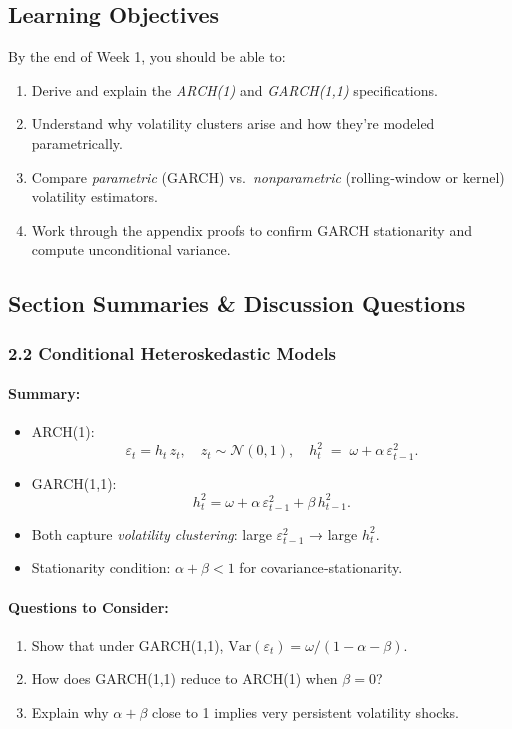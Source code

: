 \documentclass[11pt]{amsart}
\begin{document}
\subsection{Learning Objectives}
By the end of Week 1, you should be able to:
\begin{enumerate}[noitemsep,left=0pt]
  \item Derive and explain the \emph{ARCH(1)} and \emph{GARCH(1,1)} specifications.
  \item Understand why volatility clusters arise and how they're modeled parametrically.
  \item Compare \emph{parametric} (GARCH) vs.\ \emph{nonparametric} (rolling‐window or kernel) volatility estimators.
  \item Work through the appendix proofs to confirm GARCH stationarity and compute unconditional variance.
\end{enumerate}

\subsection{Section Summaries \& Discussion Questions}

\subsubsection{2.2 Conditional Heteroskedastic Models}
\paragraph{Summary:}
\begin{itemize}[noitemsep,left=0pt]
  \item ARCH(1):
    \[
      \varepsilon_t = h_t\,z_t,\quad z_t \sim \mathcal{N}(0,1),
      \quad
      h_t^2 \;=\; \omega + \alpha\,\varepsilon_{t-1}^2.
    \]
  \item GARCH(1,1):
    \[
      h_t^2 = \omega + \alpha\,\varepsilon_{t-1}^2 + \beta\,h_{t-1}^2.
    \]
  \item Both capture \emph{volatility clustering}: large $\varepsilon_{t-1}^2$ → large $h_t^2$.
  \item Stationarity condition: $\alpha + \beta < 1$ for covariance‐stationarity.
\end{itemize}

\paragraph{Questions to Consider:}
\begin{enumerate}[noitemsep,left=0pt]
  \item Show that under GARCH(1,1), $\mathrm{Var}(\varepsilon_t) = \omega/(1 - \alpha - \beta)$.
  \item How does GARCH(1,1) reduce to ARCH(1) when $\beta = 0$?
  \item Explain why $\alpha + \beta$ close to 1 implies very persistent volatility shocks.
\end{enumerate}
\end{document}

